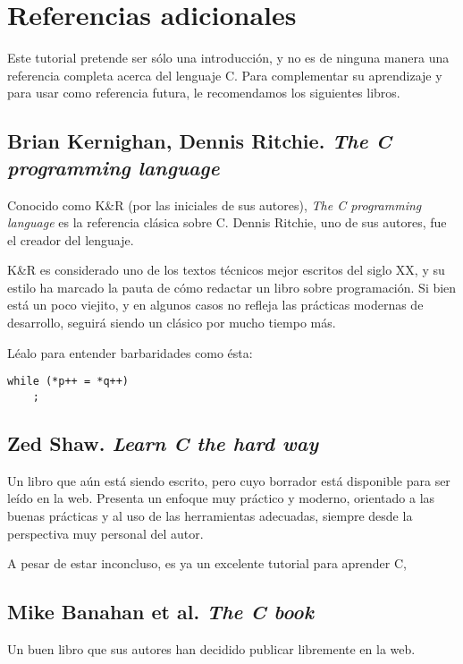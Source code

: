 \chapter{Referencias adicionales}

Este tutorial pretende ser sólo una introducción, y no es de ninguna
manera una referencia completa acerca del lenguaje C. Para complementar
su aprendizaje y para usar como referencia futura, le recomendamos los
siguientes libros.

\section{Brian Kernighan, Dennis Ritchie. \emph{The C programming
language}}

Conocido como K\&R (por las iniciales de sus autores), \emph{The C
programming language} es la referencia clásica sobre C. Dennis Ritchie,
uno de sus autores, fue el creador del lenguaje.

K\&R es considerado uno de los textos técnicos mejor escritos del siglo
XX, y su estilo ha marcado la pauta de cómo redactar un libro sobre
programación. Si bien está un poco viejito, y en algunos casos no
refleja las prácticas modernas de desarrollo, seguirá siendo un clásico
por mucho tiempo más.

Léalo para entender barbaridades como ésta:

\begin{lstlisting}
while (*p++ = *q++)
    ;
\end{lstlisting}

\section{Zed Shaw. \emph{Learn C the hard way}}

Un libro que aún está siendo escrito, pero cuyo borrador está disponible
para ser leído en la web. Presenta un enfoque muy práctico y moderno,
orientado a las buenas prácticas y al uso de las herramientas adecuadas,
siempre desde la perspectiva muy personal del autor.

A pesar de estar inconcluso, es ya un excelente tutorial para aprender
C,

\section{Mike Banahan et al. \emph{The C book}}

Un buen libro que sus autores han decidido publicar libremente en la
web.
